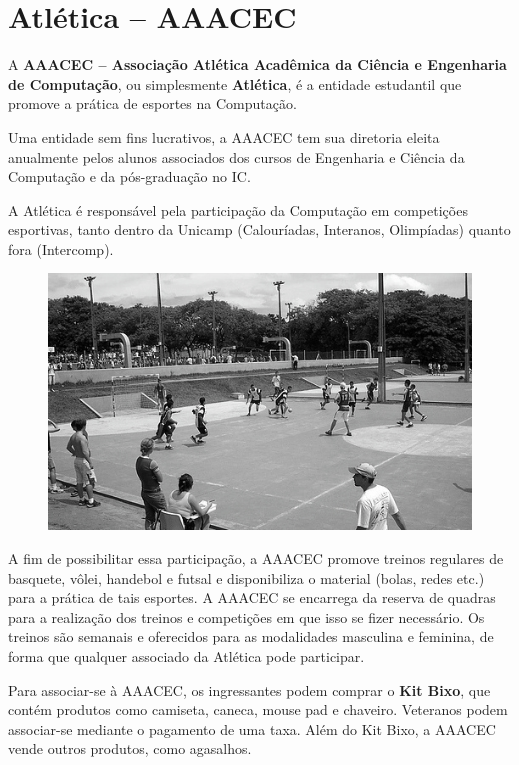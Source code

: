 
\section{Atlética -- AAACEC}

A \textbf{AAACEC -- Associação Atlética Acadêmica da Ciência e Engenharia de
Computação}, ou simplesmente \textbf{Atlética}, é a entidade estudantil que
promove a prática de esportes na Computação.

Uma entidade sem fins lucrativos, a AAACEC tem sua diretoria eleita anualmente
pelos alunos associados dos cursos de Engenharia e Ciência da Computação e da
pós-graduação no IC.

A Atlética é responsável pela participação da Computação em competições
esportivas, tanto dentro da Unicamp (Calouríadas, Interanos, Olimpíadas) quanto
fora (Intercomp).

\begin{figure}[H]
    \centering
    \includegraphics[scale=0.55]{img/imgs/20-aaacec/-128.jpg}
\end{figure}

A fim de possibilitar essa participação, a AAACEC promove treinos regulares de
basquete, vôlei, handebol e futsal e disponibiliza o material (bolas, redes
etc.) para a prática de tais esportes. A AAACEC se encarrega da reserva de
quadras para a realização dos treinos e competições em que isso se fizer
necessário. Os treinos são semanais e oferecidos para as modalidades masculina e
feminina, de forma que qualquer associado da Atlética pode participar.

Para associar-se à AAACEC, os ingressantes podem comprar o \textbf{Kit Bixo},
que contém produtos como camiseta, caneca, mouse pad e chaveiro. Veteranos podem
associar-se mediante o pagamento de uma taxa. Além do Kit Bixo, a AAACEC vende
outros produtos, como agasalhos.


